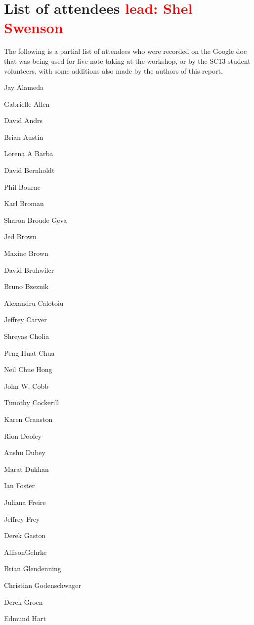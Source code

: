 \documentclass[11pt, oneside]{amsart}
\newcommand{\note}[1]{ {\textcolor{red}    { #1 }}}
\begin{document}
\appendix
\section{List of attendees \note{lead: Shel Swenson}}


The following is a partial list of attendees who were recorded on the
Google doc~\cite{WSSSPE1-google-notes} that was being used for live note taking at the workshop, or by the SC13 student volunteers, with some additions also made by the authors of this report.


\begin{multicols}{3}
\setlength{\parindent}{0pt}

Jay Alameda

Gabrielle Allen

David Andrs

Brian Austin

Lorena A Barba

David Bernholdt

Phil Bourne

Karl Broman

Sharon Broude Geva

Jed Brown

Maxine Brown

David Bruhwiler

Bruno Bzeznik

Alexandru Calotoiu

Jeffrey Carver

Shreyas Cholia

Peng Huat Chua

Neil Chue Hong

John W. Cobb

Timothy Cockerill

Karen Cranston

Rion Dooley

Anshu Dubey

Marat Dukhan

Ian Foster

Juliana Freire

Jeffrey Frey

Derek Gaston

AllisonGehrke

Brian Glendenning

Christian Godenschwager

Derek Groen

Edmund Hart


\end{multicols}
\end{document}
